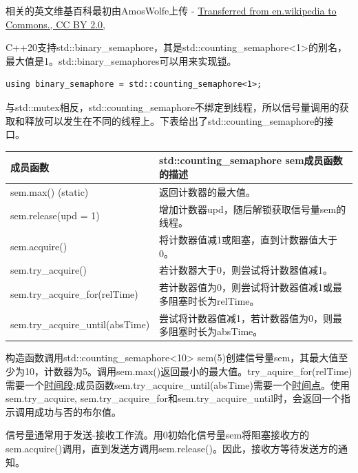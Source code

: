 相关的英文维基百科最初由AmosWolfe上传 - \href{https://commons.wikimedia.org/w/index.php?curid=1972304}{Transferred from en.wikipedia to Commons., CC BY 2.0,}

C++20支持std::binary\_semaphore，其是std::counting\_semaphore<1>的别名，最大值是1。std::binary\_semaphores可以用来实现\href{https://en.cppreference.com/w/cpp/named_req/BasicLockable}{锁}。

\begin{lstlisting}[style=styleCXX]
using binary_semaphore = std::counting_semaphore<1>;
\end{lstlisting}

与std::mutex相反，std::counting\_semaphore不绑定到线程，所以信号量调用的获取和释放可以发生在不同的线程上。下表给出了std::counting\_semaphore的接口。

\begin{table}[H]
\centering
\begin{tabular}{ll}
\textbf{成员函数} & \textbf{std::counting\_semaphore sem成员函数的描述}                                                       \\ \hline
sem.max() (static)       & 返回计数器的最大值。                                  \\
sem.release(upd = 1)             & 增加计数器upd，随后解锁获取信号量sem的线程。  \\
sem.acquire()            & 将计数器值减1或阻塞，直到计数器值大于0。 \\
sem.try\_acquire()       & 若计数器大于0，则尝试将计数器值减1。               \\
sem.try\_acquire\_for(relTime)   & 若计数器值为0，则尝试将计数器值减1或最多阻塞时长为relTime。   \\
sem.try\_acquire\_until(absTime) & 尝试将计数器值减1，若计数器值为0，则最多阻塞时长为absTime。
\end{tabular}
\end{table}

构造函数调用std::counting\_semaphore<10> sem(5)创建信号量sem，其最大值至少为10，计数器为5。调用sem.max()返回最小的最大值。try\_aquire\_for(relTime)需要一个\href{https://en.cppreference.com/w/cpp/chrono/duration}{时间段};成员函数sem.try\_acquire\_until(absTime)需要一个\href{https://en.cppreference.com/w/cpp/chrono/time_point}{时间点}。使用sem.try\_acquire, sem.try\_acquire\_for和sem.try\_acquire\_until时，会返回一个指示调用成功与否的布尔值。

信号量通常用于发送-接收工作流。用0初始化信号量sem将阻塞接收方的sem.acquire()调用，直到发送方调用sem.release()。因此，接收方等待发送方的通知。

